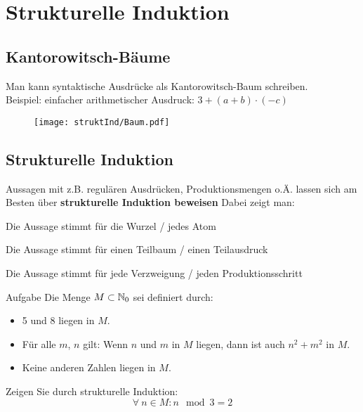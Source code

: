 
\section{Strukturelle Induktion}
\subsection{Kantorowitsch-Bäume}
\begin{frame}
	Man kann syntaktische Ausdrücke als Kantorowitsch-Baum schreiben. \\
	Beispiel: einfacher arithmetischer Ausdruck: $3 + (a + b) \cdot (-c)$ \pause
	\begin{figure}[H]
		\centering
		\texttt{[image: struktInd/Baum.pdf]}
	\end{figure}
\end{frame}

\subsection{Strukturelle Induktion}
\begin{frame}
	Aussagen mit z.B. regulären Ausdrücken, Produktionsmengen o.Ä. lassen sich am Besten über \textbf{strukturelle Induktion beweisen} \pause
	Dabei zeigt man:
	\begin{description}[<+->]
		\item[Induktionsanfang] Die Aussage stimmt für die Wurzel / jedes Atom
		\item[Induktionsvoraussetzung] Die Aussage stimmt für einen Teilbaum / einen Teilausdruck
		\item[Induktionsschluss] Die Aussage stimmt für jede Verzweigung / jeden Produktionsschritt
	\end{description}
\end{frame}

\begin{frame}{Aufgabe}
	Die Menge $M \subset \mathbb{N}_0$ sei definiert durch:
	\begin{itemize}
		\item 5 und 8 liegen in $M$.
		\item Für alle $m$, $n$ gilt: Wenn $n$ und $m$ in $M$ liegen, dann ist auch $n^2 + m^2$ in $M$.
		\item Keine anderen Zahlen liegen in $M$.
	\end{itemize}
	Zeigen Sie durch strukturelle Induktion:
		$$\forall \ n \in M : n \mod 3 = 2$$
\end{frame}


